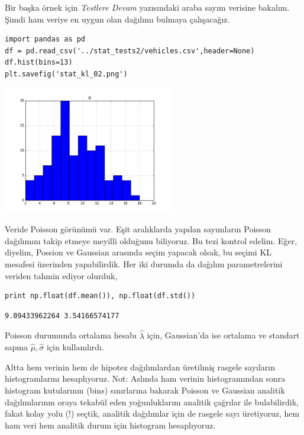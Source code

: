 \documentclass[12pt,fleqn]{article}\usepackage{../../common}
\begin{document}
Bir başka örnek için {\em Testlere Devam} yazısındaki araba sayım verisine
bakalım. Şimdi ham veriye en uygun olan dağılımı bulmaya çalışacağız. 

\begin{verbatim}
import pandas as pd
df = pd.read_csv('../stat_tests2/vehicles.csv',header=None)
df.hist(bins=13)
plt.savefig('stat_kl_02.png')
\end{verbatim}

\includegraphics[width=20em]{stat_kl_02.png}

Veride Poisson görünümü var. Eşit aralıklarda yapılan sayımların Poisson
dağılımını takip etmeye meyilli olduğunu biliyoruz. Bu tezi kontrol
edelim. Eğer, diyelim, Possion ve Gaussian arasında seçim yapacak olsak, bu
seçimi KL mesafesi üzerinden yapabilirdik. Her iki durumda da dağılım
parametrelerini veriden tahmin ediyor olurduk,

\begin{verbatim}
print np.float(df.mean()), np.float(df.std())
\end{verbatim}

\begin{verbatim}
9.09433962264 3.54166574177
\end{verbatim}

Poisson durumunda ortalama hesabı $\hat{\lambda}$ için, Gaussian'da ise
ortalama ve standart sapma $\hat{\mu},\hat{\sigma}$ için
kullanılırdı. 

Altta hem verinin hem de hipotez dağılımlardan üretilmiş rasgele sayıların
histogramlarını hesaplıyoruz. Not: Aslında ham verinin histogramından sonra
histogram kutularının (bins) sınırlarına bakarak Poisson ve Gaussian
analitik dağılımlarının oraya tekabül eden yoğunluklarını analitik çağrılar
ile bulabilirdik, fakat kolay yolu (!)  seçtik, analitik dağılımlar için de
rasgele sayı üretiyoruz, hem ham veri hem analitik durum için histogram
hesaplıyoruz.
\end{document}
